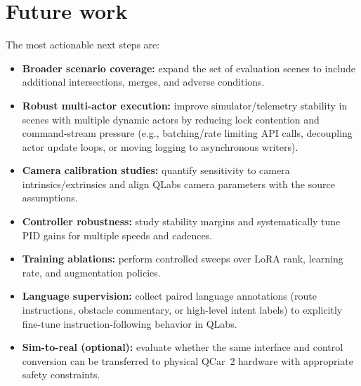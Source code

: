 \section{Future work}
\label{sec:future-work}
The most actionable next steps are:
\begin{itemize}[leftmargin=*,itemsep=0.25em]
  \item \textbf{Broader scenario coverage:} expand the set of evaluation scenes to include additional intersections, merges, and adverse conditions.
  \item \textbf{Robust multi-actor execution:} improve simulator/telemetry stability in scenes with multiple dynamic actors by reducing lock contention and command-stream pressure (e.g., batching/rate limiting API calls, decoupling actor update loops, or moving logging to asynchronous writers).
  \item \textbf{Camera calibration studies:} quantify sensitivity to camera intrinsics/extrinsics and align QLabs camera parameters with the source assumptions.
  \item \textbf{Controller robustness:} study stability margins and systematically tune PID gains for multiple speeds and cadences.
  \item \textbf{Training ablations:} perform controlled sweeps over LoRA rank, learning rate, and augmentation policies.
  \item \textbf{Language supervision:} collect paired language annotations (route instructions, obstacle commentary, or high-level intent labels) to explicitly fine-tune instruction-following behavior in QLabs.
  \item \textbf{Sim-to-real \citep{tobin2017domain} (optional):} evaluate whether the same interface and control conversion can be transferred to physical QCar~2 hardware with appropriate safety constraints.
\end{itemize}

